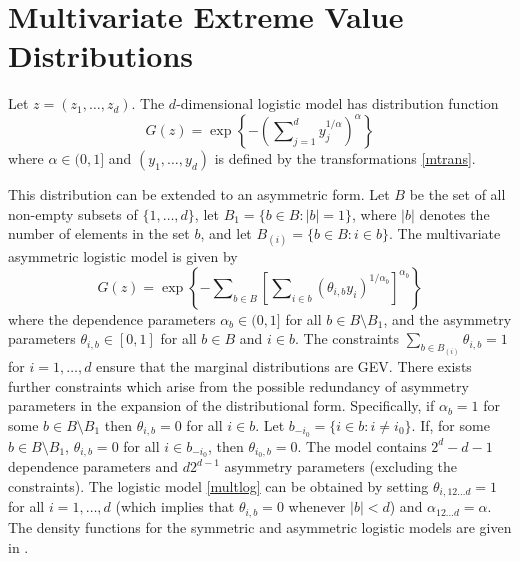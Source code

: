\documentclass[11pt,a4paper]{article}
\begin{document}
\section{Multivariate Extreme Value Distributions}
\setcounter{footnote}{0}
\label{mult}

Let $z=(z_1,\dots,z_d)$.
The $d$-dimensional logistic model \citep{gumb60b} has distribution function
\begin{equation}
G(z) = \exp\left\{-\left(\sum\nolimits_{j=1}^d y_j^{1/\alpha}\right)^\alpha\right\}
\label{multlog}
\end{equation} 
where $\alpha\in(0,1]$ and $(y_1,\dots,y_d)$ is defined by the transformations \eqref{mtrans}.

This distribution can be extended to an asymmetric form. 
Let $B$ be the set of all non-empty subsets of $\{1,\dots,d\}$, let $B_1=\{b \in B:|b|=1\}$, where $|b|$ denotes the number of elements in the set $b$,  and let $B_{(i)}=\{b \in B:i \in b\}$.
The multivariate asymmetric logistic model \citep{tawn90} is given by
\begin{equation*}
G(z)=\exp\left\{-\sum\nolimits_{b \in B} \left[\sum\nolimits_{i \in b}(\theta_{i,b}y_i)^{1/\alpha_b}\right]^{\alpha_b}\right\}
\label{multalog}
\end{equation*} 
where the dependence parameters $\alpha_b\in(0,1]$ for all $b\in B \setminus B_1$, and the asymmetry parameters $\theta_{i,b}\in[0,1]$ for all $b\in B$ and $i\in b$.
The constraints $\sum_{b \in B_{(i)}}\theta_{i,b}=1$ for $i=1,\dots,d$ ensure that the marginal distributions are GEV.
There exists further constraints which arise from the possible redundancy of asymmetry parameters in the expansion of the distributional form.
Specifically, if $\alpha_b=1$ for some $b\in B \setminus B_1$ then $\theta_{i,b}=0$ for all $i \in b$.
Let $b_{-i_0}=\{i \in b:i \neq i_0\}$.
If, for some $b \in B \setminus B_1$, $\theta_{i,b}=0$ for all $i \in b_{-i_0}$, then $\theta_{i_0,b}=0$.
The model contains $2^d-d-1$ dependence parameters and $d2^{d-1}$ asymmetry parameters (excluding the constraints).
The logistic model \eqref{multlog} can be obtained by setting $\theta_{i,12 \dots d}=1$ for all $i = 1,\dots,d$ (which implies that $\theta_{i,b}=0$ whenever $|b|<d$) and $\alpha_{12 \dots d} = \alpha$.
The density functions for the symmetric and asymmetric logistic models are given in \citet{step:phd}.
\end{document}
